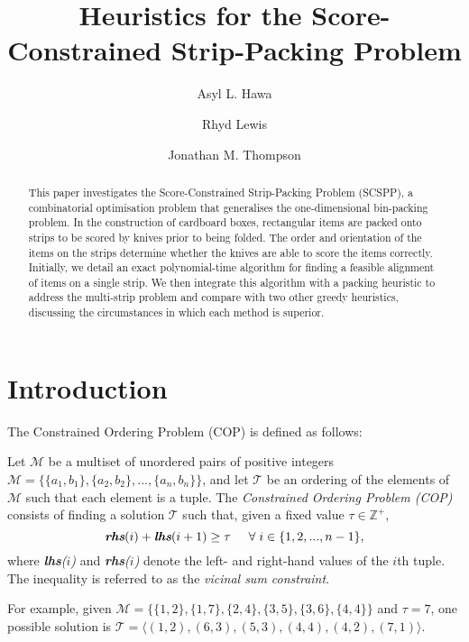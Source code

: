 \documentclass[runningheads]{llncs}
\begin{document}
	
\title{Heuristics for the Score-Constrained Strip-Packing Problem}
\author{Asyl L. Hawa \and Rhyd Lewis \and Jonathan M. Thompson}
\maketitle

\begin{abstract}
	This paper investigates the Score-Constrained Strip-Packing Problem (SCSPP), a combinatorial optimisation problem that generalises the one-dimensional bin-packing problem. In the construction of cardboard boxes, rectangular items are packed onto strips to be scored by knives prior to being folded. The order and orientation of the items on the strips determine whether the knives are able to score the items correctly. Initially, we detail an exact polynomial-time algorithm for finding a feasible alignment of items on a single strip. We then integrate this algorithm with a packing heuristic to address the multi-strip problem and compare with two other greedy heuristics, discussing the circumstances in which each method is superior.
\end{abstract}

\section{Introduction}
\label{sec:intro}
The Constrained Ordering Problem (COP) is defined as follows:

\begin{definition}
	\label{defn:cop}
	Let $\mathcal{M}$ be a multiset of unordered pairs of positive integers $\mathcal{M} = \{\{a_1, b_1\}, \{a_2,b_2\},...,\{a_n,b_n\}\}$, and let $\mathcal{T}$ be an ordering of the elements of $\mathcal{M}$ such that each element is a tuple. The \emph{Constrained Ordering Problem (COP)} consists of finding a solution $\mathcal{T}$ such that, given a fixed value $\tau \in \mathbb{Z}^{+},$
	\begin{equation}
		\label{eqn:vsc}
		\emph{\textbf{rhs}}(i) + \emph{\textbf{lhs}}(i+1) \geq \tau \hspace{5mm} \forall \hspace{1mm} i \in \{1,2,..., n-1\},
	\end{equation}
	where \emph{\textbf{lhs}($i$)} and \emph{\textbf{rhs}($i$)} denote the left- and right-hand values of the $i$th tuple. The inequality is referred to as the \emph{vicinal sum constraint}.
\end{definition}
For example, given $\mathcal{M} = \{\{1,2\}, \{1,7\}, \{2,4\}, \{3,5\}, \{3,6\}, \{4,4\}\}$ and $\tau = 7$, one possible solution is $\mathcal{T} = \langle(1,2), (6,3), (5,3), (4,4), (4,2), (7,1) \rangle$.
\end{document}
